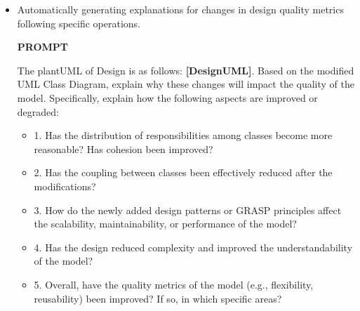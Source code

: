 \documentclass[pdflatex,sn-mathphys-num]{sn-jnl}%
\theoremstyle{thmstyleone}%
\theoremstyle{thmstyletwo}%
\theoremstyle{thmstylethree}%
\begin{document}
\begin{itemize}
One of the key strengths of this prompt lies in its focus on clarity and step-by-step reasoning. The Chain of Thought (CoT) methodology is explicitly embedded, encouraging the model to break down complex design quality assessments into manageable components. This approach not only improves the interpretability of the recommendations but also ensures that the reasoning behind each suggestion is transparent and traceable. Furthermore, the prompt emphasizes a dual-structured response, first presenting concrete recommendations and then providing detailed justifications. This structure fosters a deeper understanding of how the proposed changes will improve design quality metrics, such as maintainability, scalability, and performance.

Another notable advantage is the explicit integration of both design patterns and GRASP principles. By asking the model to evaluate the applicability of patterns such as Singleton, Factory, and Observer, the prompt ensures that the recommendations are grounded in established strategies for solving common design challenges. Simultaneously, GRASP principles guide the analysis of responsibility allocation and interactions between classes, addressing issues like high coupling and low cohesion. This dual focus enables a holistic quality assessment of the design, balancing the structural and behavioral aspects of the model.
    \item Automatically generating explanations for changes in design quality metrics following specific operations.
    
\begin{tcolorbox}[title = {Model refactoring Explanation}]
\textbf{PROMPT}

The plantUML of Design is as follows: \textbf{[DesignUML]}. Based on the modified UML Class Diagram, explain why these changes will impact the quality of the model. Specifically, explain how the following aspects are improved or degraded:
\begin{itemize}
    \item 1. Has the distribution of responsibilities among classes become more reasonable? Has cohesion been improved?
    \item 2. Has the coupling between classes been effectively reduced after the modifications?
    \item 3. How do the newly added design patterns or GRASP principles affect the scalability, maintainability, or performance of the model?
    \item 4. Has the design reduced complexity and improved the understandability of the model?
    \item 5. Overall, have the quality metrics of the model (e.g., flexibility, reusability) been improved? If so, in which specific areas?
\end{itemize}


\end{tcolorbox}
\end{itemize}
\end{document}
